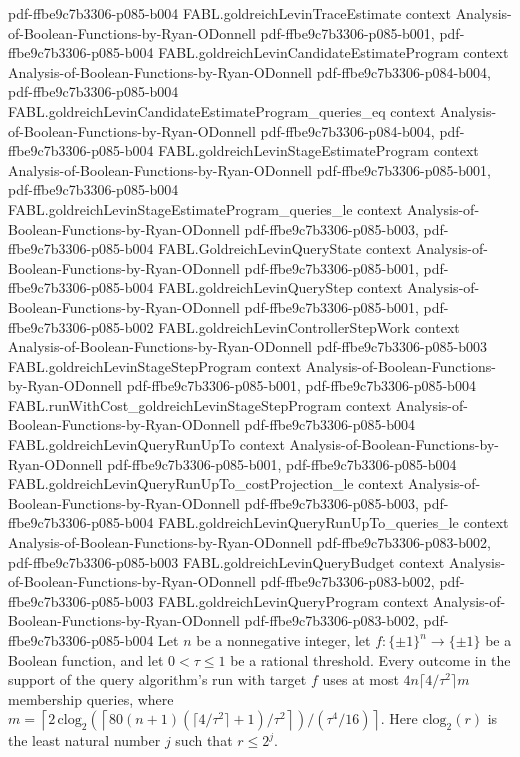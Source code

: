 \begin{theorem}
  {pdf-ffbe9c7b3306-p085-b004}
\proofstep
  {FABL.goldreichLevinTraceEstimate}
  {context}
  {Analysis-of-Boolean-Functions-by-Ryan-ODonnell}
  {pdf-ffbe9c7b3306-p085-b001,
    pdf-ffbe9c7b3306-p085-b004}
\proofstep
  {FABL.goldreichLevinCandidateEstimateProgram}
  {context}
  {Analysis-of-Boolean-Functions-by-Ryan-ODonnell}
  {pdf-ffbe9c7b3306-p084-b004,
    pdf-ffbe9c7b3306-p085-b004}
\proofstep
  {FABL.goldreichLevinCandidateEstimateProgram_queries_eq}
  {context}
  {Analysis-of-Boolean-Functions-by-Ryan-ODonnell}
  {pdf-ffbe9c7b3306-p084-b004,
    pdf-ffbe9c7b3306-p085-b004}
\proofstep
  {FABL.goldreichLevinStageEstimateProgram}
  {context}
  {Analysis-of-Boolean-Functions-by-Ryan-ODonnell}
  {pdf-ffbe9c7b3306-p085-b001,
    pdf-ffbe9c7b3306-p085-b004}
\proofstep
  {FABL.goldreichLevinStageEstimateProgram_queries_le}
  {context}
  {Analysis-of-Boolean-Functions-by-Ryan-ODonnell}
  {pdf-ffbe9c7b3306-p085-b003,
    pdf-ffbe9c7b3306-p085-b004}
\proofstep
  {FABL.GoldreichLevinQueryState}
  {context}
  {Analysis-of-Boolean-Functions-by-Ryan-ODonnell}
  {pdf-ffbe9c7b3306-p085-b001,
    pdf-ffbe9c7b3306-p085-b004}
\proofstep
  {FABL.goldreichLevinQueryStep}
  {context}
  {Analysis-of-Boolean-Functions-by-Ryan-ODonnell}
  {pdf-ffbe9c7b3306-p085-b001,
    pdf-ffbe9c7b3306-p085-b002}
\proofstep
  {FABL.goldreichLevinControllerStepWork}
  {context}
  {Analysis-of-Boolean-Functions-by-Ryan-ODonnell}
  {pdf-ffbe9c7b3306-p085-b003}
\proofstep
  {FABL.goldreichLevinStageStepProgram}
  {context}
  {Analysis-of-Boolean-Functions-by-Ryan-ODonnell}
  {pdf-ffbe9c7b3306-p085-b001,
    pdf-ffbe9c7b3306-p085-b004}
\proofstep
  {FABL.runWithCost_goldreichLevinStageStepProgram}
  {context}
  {Analysis-of-Boolean-Functions-by-Ryan-ODonnell}
  {pdf-ffbe9c7b3306-p085-b004}
\proofstep
  {FABL.goldreichLevinQueryRunUpTo}
  {context}
  {Analysis-of-Boolean-Functions-by-Ryan-ODonnell}
  {pdf-ffbe9c7b3306-p085-b001,
    pdf-ffbe9c7b3306-p085-b004}
\proofstep
  {FABL.goldreichLevinQueryRunUpTo_costProjection_le}
  {context}
  {Analysis-of-Boolean-Functions-by-Ryan-ODonnell}
  {pdf-ffbe9c7b3306-p085-b003,
    pdf-ffbe9c7b3306-p085-b004}
\proofstep
  {FABL.goldreichLevinQueryRunUpTo_queries_le}
  {context}
  {Analysis-of-Boolean-Functions-by-Ryan-ODonnell}
  {pdf-ffbe9c7b3306-p083-b002,
    pdf-ffbe9c7b3306-p085-b003}
\proofstep
  {FABL.goldreichLevinQueryBudget}
  {context}
  {Analysis-of-Boolean-Functions-by-Ryan-ODonnell}
  {pdf-ffbe9c7b3306-p083-b002,
    pdf-ffbe9c7b3306-p085-b003}
\proofstep
  {FABL.goldreichLevinQueryProgram}
  {context}
  {Analysis-of-Boolean-Functions-by-Ryan-ODonnell}
  {pdf-ffbe9c7b3306-p083-b002,
    pdf-ffbe9c7b3306-p085-b004}
Let $n$ be a nonnegative integer, let $f:\{\pm1\}^n\to\{\pm1\}$ be a Boolean function,
and let $0<\tau\le1$ be a rational threshold. Every outcome in the support of the query
algorithm’s run with target $f$ uses at most $4n\lceil4/\tau^2\rceil m$ membership
queries, where $m=\left\lceil 2\,\mathrm{clog}_2\!\left(\left\lceil
80(n+1)(\lceil4/\tau^2\rceil+1)/\tau^2\right\rceil\right)/(\tau^4/16)\right\rceil$. Here
$\mathrm{clog}_2(r)$ is the least natural number $j$ such that $r\le2^j$.
\end{theorem}

